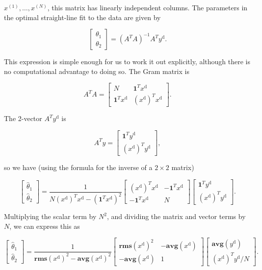 \(x^{(1)},\ldots,x^{(N)}\), this matrix has linearly independent columns. The parameters in the optimal straight-line fit to the data are given by

\[\left[\begin{array}{c}\theta_{1}\\ \theta_{2}\end{array}\right]=(A^{T}A)^{-1}A^{T}y^{\mathrm{d}}.\]

This expression is simple enough for us to work it out explicitly, although there is no computational advantage to doing so. The Gram matrix is

\[A^{T}A=\left[\begin{array}{cc}N&\mathbf{1}^{T}x^{\mathrm{d}}\\ \mathbf{1}^{T}x^{\mathrm{d}}&(x^{\mathrm{d}})^{T}x^{\mathrm{d}}\end{array} \right].\]

The 2-vector \(A^{T}y^{\mathrm{d}}\) is

\[A^{T}y=\left[\begin{array}{c}\mathbf{1}^{T}y^{\mathrm{d}}\\ (x^{\mathrm{d}})^{T}y^{\mathrm{d}}\end{array}\right],\]

so we have (using the formula for the inverse of a \(2\times 2\) matrix)

\[\left[\begin{array}{c}\hat{\theta}_{1}\\ \hat{\theta}_{2}\end{array}\right]=\frac{1}{N(x^{\mathrm{d}})^{T}x^{\mathrm{d} }-(\mathbf{1}^{T}x^{\mathrm{d}})^{2}}\left[\begin{array}{cc}(x^{\mathrm{d}}) ^{T}x^{\mathrm{d}}&-\mathbf{1}^{T}x^{\mathrm{d}}\\ -\mathbf{1}^{T}x^{\mathrm{d}}&N\end{array}\right]\left[\begin{array}{c} \mathbf{1}^{T}y^{\mathrm{d}}\\ (x^{\mathrm{d}})^{T}y^{\mathrm{d}}\end{array}\right].\]

Multiplying the scalar term by \(N^{2}\), and dividing the matrix and vector terms by \(N\), we can express this as

\[\left[\begin{array}{c}\hat{\theta}_{1}\\ \hat{\theta}_{2}\end{array}\right]=\frac{1}{\mathbf{rms}(x^{\mathrm{d}})^{2}- \mathbf{avg}(x^{\mathrm{d}})^{2}}\left[\begin{array}{cc}\mathbf{rms}(x^{ \mathrm{d}})^{2}&-\mathbf{avg}(x^{\mathrm{d}})\\ -\mathbf{avg}(x^{\mathrm{d}})&1\end{array}\right]\left[\begin{array}{c} \mathbf{avg}(y^{\mathrm{d}})\\ (x^{\mathrm{d}})^{T}y^{\mathrm{d}}/N\end{array}\right].\]

